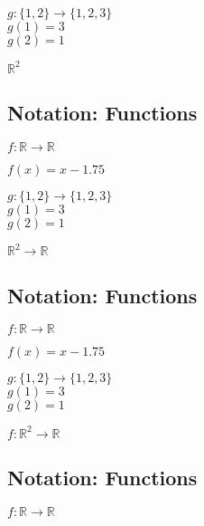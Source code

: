 \documentclass[twocolumn,20pt,fleqn]{extarticle}
\newcommand{\sep}{\vspace{0.5cm}}
\theoremstyle{plain}
\theoremstyle{definition}
\theoremstyle{remark}
\begin{document}
  $g : \{1,2\} \to \{1,2,3\}$\\
    $g(1) = 3$\\
    $g(2) = 1$\\

\sep

$\mathbb{R}^2 $


\clearpage




\subsection{Notation: Functions}

$ f: \mathbb{R}  \to \mathbb{R}$

$f(x) = x - 1.75$\\

\sep

  $g : \{1,2\} \to \{1,2,3\}$\\
    $g(1) = 3$\\
    $g(2) = 1$\\

\sep

$\mathbb{R}^2  \to \mathbb{R}$



\clearpage




\subsection{Notation: Functions}

$ f: \mathbb{R}  \to \mathbb{R}$

$f(x) = x - 1.75$\\

\sep

  $g : \{1,2\} \to \{1,2,3\}$\\
    $g(1) = 3$\\
    $g(2) = 1$\\

\sep

$ f: \mathbb{R}^2  \to \mathbb{R}$




\clearpage




\subsection{Notation: Functions}

$ f: \mathbb{R}  \to \mathbb{R}$
\end{document}
